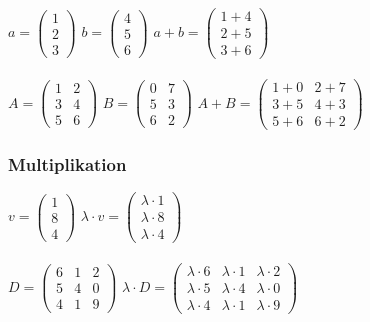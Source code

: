 			$a = \begin{pmatrix} 1\\2\\3 \end{pmatrix}$ \quad $b = \begin{pmatrix} 4\\5\\6 \end{pmatrix}$ \quad  $a+b = \begin{pmatrix} 1+4\\2+5\\3+6 \end{pmatrix}$ \\
			\\
			$A=\begin{pmatrix}
				1&2\\
				3&4\\
				5&6
			\end{pmatrix}$ \quad $ B=\begin{pmatrix}
				0&7\\
				5&3\\
				6&2
			\end{pmatrix}$ \quad $A+B=\begin{pmatrix}
				1+0&2+7\\
				3+5&4+3\\
				5+6&6+2
			\end{pmatrix}$

		    
			\subsubsection{Multiplikation}
			$v = \begin{pmatrix} 1\\8\\4 \end{pmatrix}$ \qquad $\lambda \cdot v = \begin{pmatrix} \lambda \cdot 1\\\lambda \cdot 8\\\lambda \cdot 4 \end{pmatrix}$ \\
			\\
			
			$D=\begin{pmatrix}
				6&1&2\\
				5&4&0\\
				4&1&9
			\end{pmatrix}$ \qquad $\lambda \cdot 				D=\begin{pmatrix}
				\lambda \cdot 6 & \lambda \cdot 1 & \lambda \cdot 2 \\
				\lambda \cdot 5 & \lambda \cdot 4 & \lambda \cdot 0\\
				\lambda \cdot 4 & \lambda \cdot 1 & \lambda \cdot 9
			\end{pmatrix}$ \\
			\\
				
